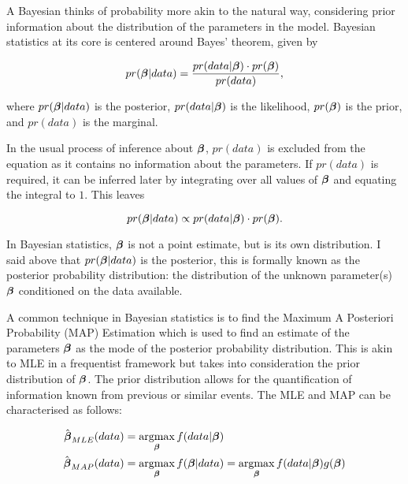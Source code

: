 \begin{appendices}
A Bayesian thinks of probability more akin to the natural way, considering prior information about the distribution of the parameters in the model. Bayesian statistics at its core is centered around Bayes' theorem, given by

\begin{equation}\label{bayes-theorem}
    pr(\boldsymbol{\beta}|data)=\frac{pr(data|\boldsymbol{\beta})\cdot pr(\boldsymbol{\beta})}{pr(data)},
\end{equation}

where $pr(\boldsymbol{\beta}|data)$ is the posterior, $pr(data|\boldsymbol{\beta})$ is the likelihood, $pr(\boldsymbol{\beta})$ is the prior, and $pr(data)$ is the marginal. 

In the usual process of inference about $\boldsymbol{\beta}$, $pr(data)$ is excluded from the equation as it contains no information about the parameters. If $pr(data)$ is required, it can be inferred later by integrating over all values of $\boldsymbol{\beta}$ and equating the integral to $1$. This leaves

\begin{equation}
    pr(\boldsymbol{\beta}|data)\propto pr(data|\boldsymbol{\beta})\cdot pr(\boldsymbol{\beta}).
\end{equation}

In Bayesian statistics, $\boldsymbol{\beta}$ is not a point estimate, but is its own distribution. I said above that $pr(\boldsymbol{\beta}|data)$ is the posterior, this is formally known as the posterior probability distribution: the distribution of the unknown parameter(s) $\boldsymbol{\beta}$ conditioned on the data available. 

A common technique in Bayesian statistics is to find the Maximum A Posteriori Probability (MAP) Estimation which is used to find an estimate of the parameters $\boldsymbol{\beta}$ as the mode of the posterior probability distribution. This is akin to MLE in a frequentist framework but takes into consideration the prior distribution of $\boldsymbol{\beta}$. The prior distribution allows for the quantification of information known from previous or similar events. The MLE and MAP can be characterised as follows:

\begin{align}
    \hat{\boldsymbol{\beta}}_{MLE}(data) &= \operatorname*{argmax}_{\boldsymbol{\beta}} f(data|\boldsymbol{\beta})\label{mle}\\
    \hat{\boldsymbol{\beta}}_{MAP}(data) &= \operatorname*{argmax}_{\boldsymbol{\beta}} f(\boldsymbol{\beta}|data) = \operatorname*{argmax}_{\boldsymbol{\beta}} f(data|\boldsymbol{\beta})g(\boldsymbol{\beta})\label{map}
\end{align}



\end{appendices}
